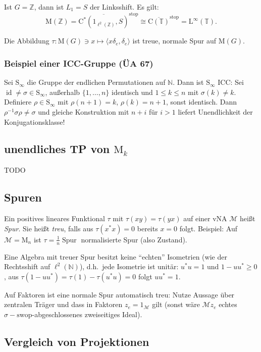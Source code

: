 \documentclass[11pt,a4paper]{scrartcl}
\newcommand{\N}{\mathbb{N}} %
\newcommand{\Z}{\mathbb{Z}} %
\newcommand{\M}{\mathcal{M}}
\theoremstyle{plain}
\theoremstyle{definition}
\theoremstyle{remark}
\DeclareMathOperator{\id}{id}
\DeclareMathOperator{\Spur}{Spur}
\begin{document}
Ist $G=\Z$, dann ist $L_1=S$ der Linksshift. Es gilt: $$\mathrm{M}(\Z)=\overline{\mathrm{C}^*(1_{\ell^2(\Z)},S)}^\mathrm{stop}\cong \overline{\mathrm{C}(\mathbb{T})}^\mathrm{stop}=\mathrm{L}^\infty(\mathbb{T}).$$

Die Abbildung $\tau: \mathrm{M}(G)\ni x\mapsto \langle x\delta_e, \delta_e\rangle$ ist treue, normale Spur auf $\mathrm{M}(G)$.

\subsubsection{Beispiel einer ICC-Gruppe (ÜA 67)}

Sei $\mathrm{S}_\infty$ die Gruppe der endlichen Permutationen auf $\N$. Dann ist $\mathrm{S}_\infty$ ICC: Sei $\id\neq \sigma \in \mathrm{S}_\infty$, außerhalb $\{1,\dots,n\}$ identisch und $1\leq k\leq n$ mit $\sigma(k)\neq k$. Definiere $\rho\in \mathrm{S}_\infty$ mit $\rho(n+1)=k$, $\rho(k)=n+1$, sonst identisch. Dann $\rho^{-1}\sigma\rho\neq \sigma$ und gleiche Konstruktion mit $n+i$ für $i>1$ liefert Unendlichkeit der Konjugationsklasse!

\subsection{unendliches TP von $\mathrm{M}_k$}

TODO

\subsection{Spuren}

Ein positives lineares Funktional $\tau$ mit $\tau(xy)=\tau(yx)$ auf einer vNA $\M$ heißt \emph{Spur}. Sie heißt \emph{treu}, falls aus $\tau(x^*x)=0$ bereits $x=0$ folgt. Beispiel: Auf $\M=\mathrm{M}_n$ ist $\tau=\frac{1}{n} \Spur$ normalisierte Spur (also Zustand).

Eine Algebra mit treuer Spur besitzt keine \enquote{echten} Isometrien (wie der Rechtsshift auf $\ell^2(\N)$), d.h.\ jede Isometrie ist unitär: $u^*u=1$ und $1-uu^* \geq 0$, aus $\tau(1-uu^*)=\tau(1)-\tau(u^*u)=0$ folgt $uu^*=1$.

Auf Faktoren ist eine normale Spur automatisch treu: Nutze Aussage über zentralen Träger und dass in Faktoren $z_e=1_\M$ gilt (sonst wäre $\M z_e$ echtes $\sigma-\mathrm{swop}$-abgeschlossenes zweiseitiges Ideal).

\subsection{Vergleich von Projektionen}
\end{document}
